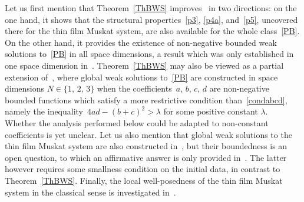 \documentclass[10pt]{amsart}
\theoremstyle{definition}\newtheorem{defi}[theo]{Definition}\newtheorem{rema}[theo]{Remark}\newtheorem{exam}[theo]{Example}\newtheorem{exem}[theo]{Example}\newtheorem{nota}[theo]{Notation}
\begin{document}
Let us first mention that Theorem~\ref{ThBWS} improves~\cite{LM22} in two directions: on the one hand, it shows that the structural properties~\eqref{p3}, \eqref{p4a}, and~\eqref{p5}, uncovered there for the thin film Muskat system, are also available for the whole class~\eqref{PB}. On the other hand, it provides the existence of non-negative bounded weak solutions to~\eqref{PB} in all space dimensions, a result which was only established in one space dimension in~\cite{LM22}. Theorem~\ref{ThBWS} may also be viewed as a partial extension of~\cite{GS14}, where global weak solutions to~\eqref{PB} are constructed in space dimensions $N\in\{1,\, 2,\, 3\}$ when the coefficients~$a,\,b,\, c,\, d$ are non-negative bounded functions which satisfy a more restrictive condition than~\eqref{condabcd}, namely the inequality~${4ad-(b+c)^2>\lambda}$ for some positive constant $\lambda$. Whether the analysis performed below could be adapted to non-constant coefficients is yet unclear. Let us also mention that global weak solutions to the thin film Muskat system are also constructed in~\cite{AIJM2018, BGB2019, ELM2011, LM2013, LM2017,ACCL2019}, but their boundedness is an open question, to which an affirmative answer is only provided in~\cite{BGB2019}. The latter however requires some smallness condition on the initial data, in contrast to Theorem~\ref{ThBWS}. Finally, the local well-posedness of the thin film Muskat system in the classical sense is investigated in~\cite{EMM2012}.

\end{document}
